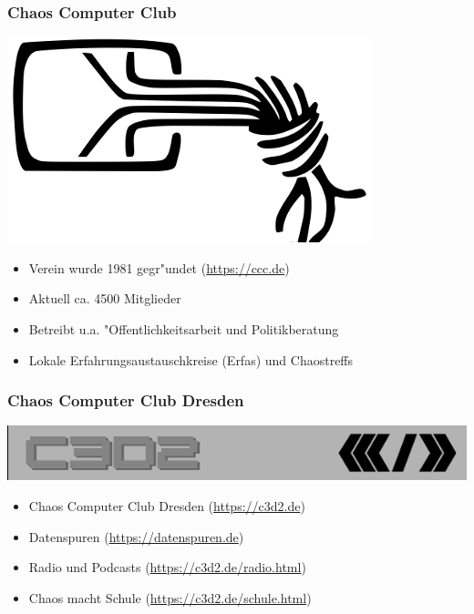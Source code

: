 \documentclass[12pt]{beamer}
\begin{document}
\begin{frame}
    \frametitle{Chaos Computer Club}
    \begin{center}
	\includegraphics[height=0.2\textheight]{img/chaosknoten.png}
    \end{center}	
    \begin{itemize}
      \item<1-> Verein wurde 1981 gegr"undet (\url{https://ccc.de})          
      \item<2-> Aktuell ca. 4500 Mitglieder
      \item<3-> Betreibt u.a. "Offentlichkeitsarbeit und Politikberatung      
      \item<4-> Lokale Erfahrungsaustauschkreise (Erfas) und Chaostreffs
    \end{itemize}
\end{frame}

\begin{frame}
  \frametitle{Chaos Computer Club Dresden}
  \begin{center}
    \includegraphics[height=0.1\textheight]{img/c3d2_logo.png}
  \end{center}
  \begin{itemize}
    \item<1-> Chaos Computer Club Dresden (\url{https://c3d2.de})          
    \item<2-> Datenspuren (\url{https://datenspuren.de})
    \item<3-> Radio und Podcasts (\url{https://c3d2.de/radio.html})
    \item<4-> Chaos macht Schule (\url{https://c3d2.de/schule.html})
  \end{itemize}
\end{frame}
\end{document}
